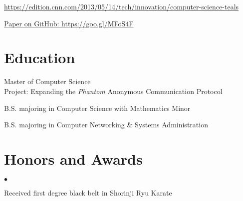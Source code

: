 \documentclass{resume}
\begin{document}
\begin{position}
  \item \href{https://goo.gl/bPKkMB}{https://edition.cnn.com/2013/05/14/tech/innovation/computer-science-teals}
\end{position}

\begin{position}
\item \href{https://goo.gl/MFoS4F}{Paper on GitHub: https://goo.gl/MFoS4F}
\end{position}

\section{Education}
\begin{school}
 \item Master of Computer Science\\
 {Project:} {\sffamily Expanding the \emph{Phantom} Anonymous Communication Protocol}\\
\end{school}

\begin{school}
     \item B.S. majoring in Computer Science with Mathematics Minor
     \item B.S. majoring in Computer Networking \& Systems Administration
\end{school}

\section{Honors and Awards}
    \begin{list}{$\bullet$}{\topsep \itemsep}
      \item Received first degree black belt in Shorinji Ryu Karate
    \end{list}
\end{document}
